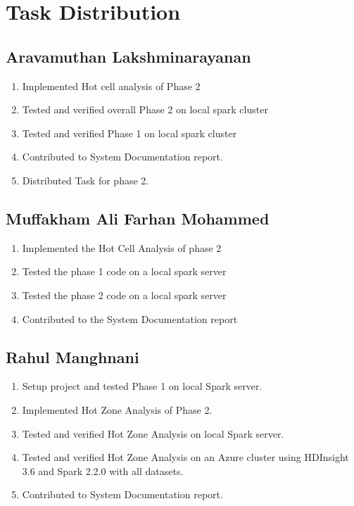 \newpage

\section{Task Distribution}

\subsection{Aravamuthan Lakshminarayanan}
\begin{enumerate}
    \item Implemented Hot cell analysis of Phase 2
    \item Tested and verified overall Phase 2 on local spark cluster 
    \item Tested and verified Phase 1 on local spark cluster
    \item Contributed to System Documentation report.
    \item Distributed Task for phase 2.
\end{enumerate}

\subsection{Muffakham Ali Farhan Mohammed}
\begin{enumerate}
    \item Implemented the Hot Cell Analysis of phase 2
    \item Tested the phase 1 code on a local spark server 
    \item Tested the phase 2 code on a local spark server 
    \item Contributed to the System Documentation report
\end{enumerate}

\subsection{Rahul Manghnani}
\begin{enumerate}
	\item Setup project and tested Phase 1 on local Spark server.
    \item Implemented Hot Zone Analysis of Phase 2.
	\item Tested and verified Hot Zone Analysis on local Spark server.
	\item Tested and verified Hot Zone Analysis on an Azure cluster using HDInsight 3.6 and Spark 2.2.0 with all datasets.
	\item Contributed to System Documentation report.
\end{enumerate}

